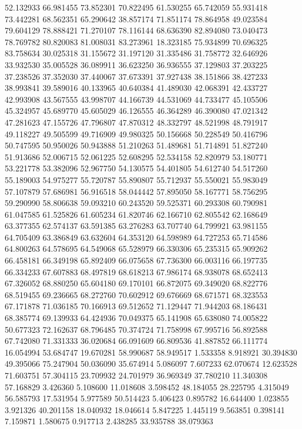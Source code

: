 52.132933
66.981455
73.852301
70.822495
61.530255
65.742059
55.931418
73.442281
68.562351
65.290642
38.857174
71.851174
78.864958
49.023584
79.604129
78.888421
71.270107
78.116144
68.636390
82.894080
73.040473
78.769782
80.820083
81.008031
83.273961
18.323185
75.934899
70.696325
83.758634
30.025318
31.155672
31.197120
31.335486
31.758772
32.646926
33.932530
35.005528
36.089911
36.623250
36.936555
37.129803
37.203225
37.238526
37.352030
37.440067
37.673391
37.927438
38.151866
38.427233
38.993841
39.589016
40.133965
40.640384
41.489030
42.068391
42.433727
42.993908
43.567555
43.998707
44.166739
44.531069
44.733477
45.105506
45.324957
45.689770
45.605029
46.126555
46.364289
46.390080
47.021342
47.281623
47.155726
47.796807
47.870312
48.332797
48.521998
48.791917
49.118227
49.505599
49.716909
49.980325
50.156668
50.228549
50.416796
50.747595
50.950026
50.943888
51.210263
51.489681
51.714891
51.827240
51.913686
52.006715
52.061225
52.608295
52.534158
52.820979
53.180771
53.221778
53.382096
52.967750
54.130575
54.401805
54.612740
54.517260
55.189003
54.975277
55.720787
55.890807
55.712937
55.550021
55.983049
57.107879
57.686981
56.916518
58.044442
57.895050
58.167771
58.756295
59.290990
58.806638
59.093210
60.243520
59.525371
60.293308
60.790981
61.047585
61.525826
61.605234
61.820746
62.166710
62.805542
62.168649
63.377355
62.574137
63.591385
63.276283
63.707740
64.799921
63.981155
64.705409
63.386849
63.632604
64.353120
64.598989
64.727253
65.714586
64.800263
64.578695
64.549068
65.528979
66.330306
65.235315
65.909262
66.458181
66.349198
65.892409
66.075658
67.736300
66.003116
66.197735
66.334233
67.607883
68.497819
68.618213
67.986174
68.938078
68.652413
67.326052
68.880250
65.604180
69.170101
66.872075
69.349020
68.822776
68.519455
69.236665
68.272760
70.602912
69.676669
68.671571
68.323553
67.171878
71.036185
70.166913
69.512652
71.129447
71.944203
68.186431
68.385774
69.139933
64.424936
70.049375
65.141908
65.638080
74.005822
50.677323
72.162637
68.796485
70.374724
71.758998
67.995716
56.892588
67.742080
71.331333
36.020684
66.091609
66.809536
41.887852
66.111774
16.054994
53.684747
19.670281
58.990687
58.949517
1.533358
8.918921
30.394830
49.395066
75.247904
50.036090
35.674914
5.086097
7.607233
62.070674
12.623528
71.603751
57.304115
23.709932
24.701979
36.969349
37.780210
11.340308
57.168829
3.426360
5.108600
11.018608
3.598452
48.184055
28.225795
4.315049
56.585793
17.531954
5.977589
50.514423
5.406423
0.895782
16.644400
1.023855
3.921326
40.201158
18.040932
18.046614
5.847225
1.445119
9.563851
0.398141
7.159871
1.580675
0.917713
2.438285
33.935788
38.079363
